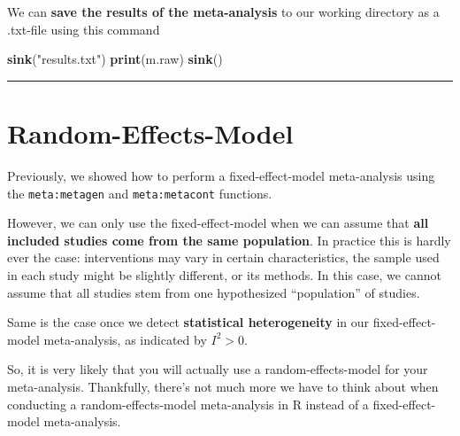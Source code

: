 \documentclass[]{book}
\newenvironment{Shaded}{\begin{snugshade}}{\end{snugshade}}
\newcommand{\KeywordTok}[1]{\textcolor[rgb]{0.13,0.29,0.53}{\textbf{#1}}}
\newcommand{\NormalTok}[1]{#1}
\newcommand{\StringTok}[1]{\textcolor[rgb]{0.31,0.60,0.02}{#1}}
\begin{document}
We can \textbf{save the results of the meta-analysis} to our working directory as a .txt-file using this command

\begin{Shaded}
\begin{Highlighting}[]
\KeywordTok{sink}\NormalTok{(}\StringTok{"results.txt"}\NormalTok{)}
\KeywordTok{print}\NormalTok{(m.raw)}
\KeywordTok{sink}\NormalTok{()}
\end{Highlighting}
\end{Shaded}

\begin{center}\rule{0.5\linewidth}{\linethickness}\end{center}

\hypertarget{random}{%
\section{Random-Effects-Model}\label{random}}

Previously, we showed how to perform a fixed-effect-model meta-analysis using the \texttt{meta:metagen} and \texttt{meta:metacont} functions.

However, we can only use the fixed-effect-model when we can assume that \textbf{all included studies come from the same population}. In practice this is hardly ever the case: interventions may vary in certain characteristics, the sample used in each study might be slightly different, or its methods. In this case, we cannot assume that all studies stem from one hypothesized ``population'' of studies.

Same is the case once we detect \textbf{statistical heterogeneity} in our fixed-effect-model meta-analysis, as indicated by \(I^{2}>0\).

So, it is very likely that you will actually use a random-effects-model for your meta-analysis. Thankfully, there's not much more we have to think about when conducting a random-effects-model meta-analysis in R instead of a fixed-effect-model meta-analysis.
\end{document}
